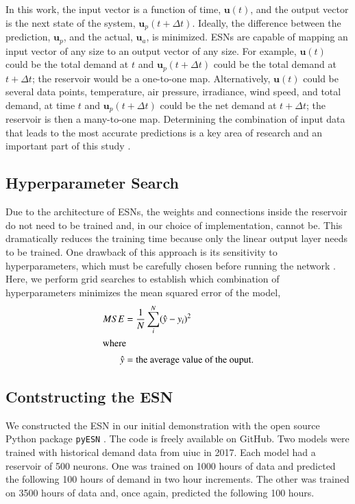 In this
work, the input vector is a function of time, $\bm{u}(t)$, and the output
vector is the next state of the system, $\bm{u}_p(t+\Delta t)$. Ideally, the
difference between the prediction, $\bm{u}_p$, and the actual, $\bm{u}_a$, is
minimized. \glspl{ESN} are capable of mapping an input vector of any size to
an output vector of any size. For example, $\bm{u}(t)$ could be the total
demand
at $t$ and $\bm{u}_p(t+\Delta t)$ could be the total demand at $t+\Delta t$;
the reservoir would be a one-to-one map. Alternatively, $\bm{u}(t)$ could be
several data points, temperature, air pressure, irradiance, wind speed, and
total demand, at time $t$ and $\bm{u}_p(t+\Delta t)$ could be the net demand at
$t+\Delta t$; the reservoir is then a many-to-one map. Determining the
combination of input data that leads to the most accurate predictions is a key
area of research and an important part of this study \cite{kobylinski_high-resolution_2020,bianchi_reservoir_2020}.

\subsection{Hyperparameter Search}
Due to the architecture of \glspl{ESN}, the weights and connections
inside the reservoir do not need to be trained and, in our choice of
implementation, cannot be. This dramatically reduces the training time because
only the linear output layer needs to be trained. One drawback of this approach
is its sensitivity to hyperparameters, which must be carefully chosen before
running the network \cite{ pathak_model-free_2018,
lukosevicius_practical_2012, lukosevicius_reservoir_2009,gallicchio_deep_2019}.
Here, we perform grid searches
to establish which combination of hyperparameters minimizes the mean squared
error of the model,
\begin{align}
	MSE &= \frac{1}{N}\sum_i^N (\hat{y} - y_i)^2\\
	\intertext{where}
	\hat{y} &= \mbox{the average value of the ouput.}\nonumber
\end{align}

\subsection{Contstructing the \gls{ESN}}

We constructed the \gls{ESN} in our initial demonstration with the open source
Python package \texttt{pyESN} \cite{korndorfer_pyesn_2015}. The code
is freely available on GitHub. Two models were trained with
historical demand data from \gls{uiuc} in 2017.  Each model had a
reservoir of 500 neurons. One was trained on 1000 hours of
data and predicted the following 100 hours of demand in two hour
increments. The other was trained on 3500 hours of data and, once again,
predicted the following 100 hours.

